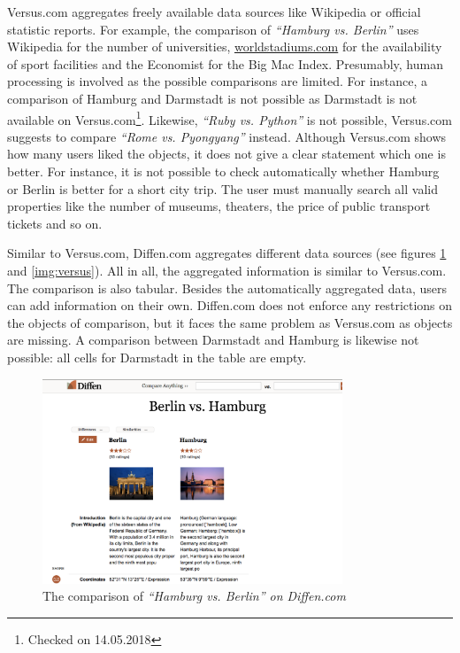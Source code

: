 Versus.com aggregates freely available data sources like Wikipedia or official statistic reports. For example, the comparison of  \emph{\enquote{Hamburg vs. Berlin}} uses Wikipedia for the number of universities, \url{worldstadiums.com} for the availability of sport facilities and the Economist for the Big Mac Index. Presumably, human processing is involved as the possible comparisons are limited. For instance, a comparison of Hamburg and Darmstadt is not possible as Darmstadt is not available on Versus.com\footnote{Checked on 14.05.2018}. Likewise, \emph{\enquote{Ruby vs. Python}} is not possible, Versus.com suggests to compare  \emph{\enquote{Rome vs. Pyongyang}} instead. Although Versus.com shows how many users liked the objects, it does not give a clear statement which one is better. For instance, it is not possible to check automatically whether Hamburg or Berlin is better for a short city trip. The user must manually search all valid properties like the number of museums, theaters, the price of public transport tickets and so on.

Similar to Versus.com, Diffen.com aggregates different data sources (see figures \ref{img:diffen} and \ref{img:versus}). All in all, the aggregated information is similar to Versus.com. The comparison is also tabular. Besides the automatically aggregated data, users can add information on their own. Diffen.com does not enforce any restrictions on the objects of comparison, but it faces the same problem as Versus.com as objects are missing. A comparison between Darmstadt and Hamburg is likewise not possible: all cells for Darmstadt in the table are empty.

\begin{figure}[htp]
 \centering
	\includegraphics[width=0.8\textwidth]{images/ds-sys/diffen}
	\caption{The comparison of \emph{\enquote{Hamburg vs. Berlin} on Diffen.com}}
		\label{img:diffen}
\end{figure}

